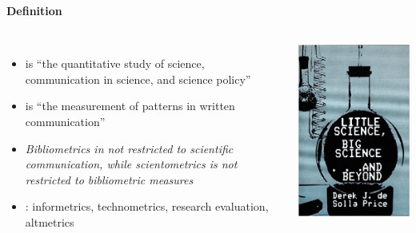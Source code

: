 \documentclass[8pt]{beamer}
\begin{document}
\begin{frame}
\frametitle{\insertsection}
\framesubtitle{Definition}

\begin{columns}[c]

\begin{itemize}
\item {\color{blue}{Scientometrics}} is ``the quantitative study of science, communication in science, and science policy'' \cite{Hess1997}

\item {\color{blue}{Bibliometrics}} is ``the measurement of patterns in written communication'' \cite{Broadus1987}

\item \textit{Bibliometrics in not restricted to scientific communication, while scientometrics is not restricted to bibliometric measures}

\item {\color{blue}{Related sub-disciplines}}: informetrics, technometrics, research evaluation, altmetrics

\end{itemize}   

\centering
\includegraphics[height=0.7\textheight]{price}\\    
\tiny{\cite{DeSollaPrice1963}}
 
\end{columns}

\end{frame}
\end{document}
